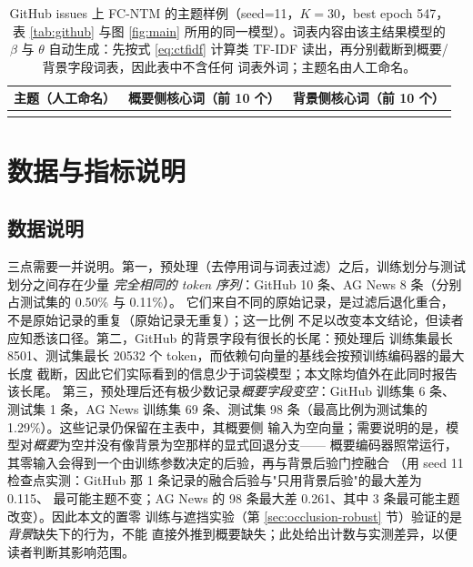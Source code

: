 \documentclass[11pt]{ctexart}
\newcommand{\fcntm}{FC-NTM}
\begin{document}
\begin{table}[t]
\centering
\caption{GitHub issues 上 \fcntm{} 的主题样例（seed=11，$K=30$，best epoch 547，
表 \ref{tab:github} 与图 \ref{fig:main} 所用的同一模型）。词表内容由该主结果模型的
$\beta$ 与 $\theta$ 自动生成：先按式
\eqref{eq:ctfidf} 计算类 TF-IDF 读出，再分别截断到概要/背景字段词表，因此表中不含任何
词表外词；主题名由人工命名。}
\label{tab:topics}
\footnotesize
\setlength{\tabcolsep}{4pt}
\begin{tabular}{@{}p{2.7cm}p{5.9cm}p{5.9cm}@{}}
\toprule
主题（人工命名） & 概要侧核心词（前 10 个） & 背景侧核心词（前 10 个） \\
\midrule

\\   %
\bottomrule
\end{tabular}
\end{table}

\section{数据与指标说明}

\subsection*{数据说明}

三点需要一并说明。第一，预处理（去停用词与词表过滤）之后，训练划分与测试划分之间存在少量
\emph{完全相同的 token 序列}：GitHub 10 条、AG News 8 条（分别占测试集的 0.50\% 与 0.11\%）。
它们来自不同的原始记录，是过滤后退化重合，不是原始记录的重复（原始记录无重复）；这一比例
不足以改变本文结论，但读者应知悉该口径。第二，GitHub 的背景字段有很长的长尾：预处理后
训练集最长 8501、测试集最长 20532 个 token，而依赖句向量的基线会按预训练编码器的最大长度
截断，因此它们实际看到的信息少于词袋模型；本文除均值外在此同时报告该长尾。
第三，预处理后还有极少数记录\emph{概要字段变空}：GitHub 训练集 6 条、测试集 1 条，AG News
训练集 69 条、测试集 98 条（最高比例为测试集的 1.29\%）。这些记录仍保留在主表中，其概要侧
输入为空向量；需要说明的是，模型对\emph{概要}为空并没有像背景为空那样的显式回退分支——
概要编码器照常运行，其零输入会得到一个由训练参数决定的后验，再与背景后验门控融合
（用 seed 11 检查点实测：GitHub 那 1 条记录的融合后验与"只用背景后验"的最大差为 0.115、
最可能主题不变；AG News 的 98 条最大差 0.261、其中 3 条最可能主题改变）。因此本文的置零
训练与遮挡实验（第 \ref{sec:occlusion-robust} 节）验证的是\emph{背景}缺失下的行为，不能
直接外推到概要缺失；此处给出计数与实测差异，以便读者判断其影响范围。
\end{document}
